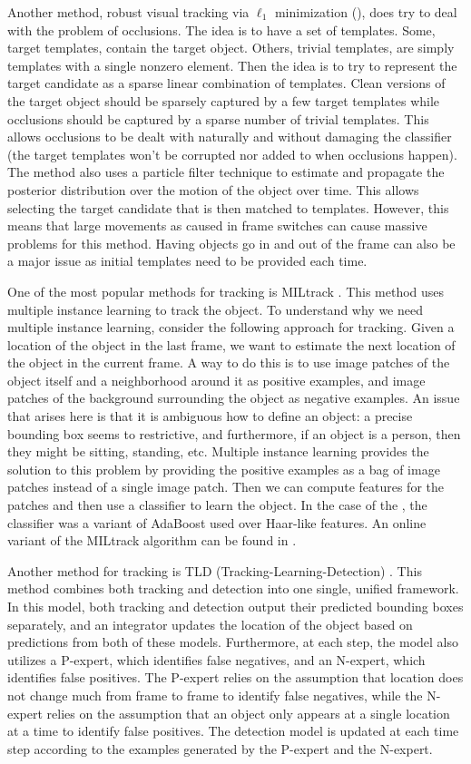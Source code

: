 \documentclass{article}
\begin{document}
Another method, robust visual tracking via $\ell_1$ minimization (\cite{L1}), does try to deal with the problem of occlusions. The idea is to have a set of templates. Some, target templates, contain the target
object. Others, trivial templates, are simply templates with a single nonzero element. Then the idea is to try to represent the target candidate as a sparse linear combination of templates. Clean versions of the
target object should be sparsely captured by a few target templates while occlusions should be captured by a sparse number of trivial templates. This allows occlusions to be dealt with naturally and without
damaging the classifier (the target templates won't be corrupted nor added to when occlusions happen). The method also uses a particle filter technique to estimate and propagate the posterior distribution
over the motion of the object over time. This allows selecting the target candidate that is then matched to templates. However, this means that large movements as caused in frame switches can cause massive
problems for this method. Having objects go in and out of the frame can also be a major issue as initial templates need to be provided each time.

One of the most popular methods for tracking is MILtrack \cite{miltrack}. This
method uses multiple instance learning to track the object. To understand
why we need multiple instance learning, consider the following approach for tracking.
Given a location of the object in the last frame, we want to estimate the next location
of the object in the current frame. A way to do this is to use image patches of the object
itself and a neighborhood around it as positive examples, and image patches of
the background surrounding the object as negative examples. An issue that arises
here is that it is ambiguous how to define an object: a precise bounding box seems
to restrictive, and furthermore, if an object is a person, then they might be sitting,
standing, etc. Multiple instance learning provides the solution to this problem
by providing the positive examples as a bag of image patches instead of a
single image patch. Then we can compute features for the patches and then
use a classifier to learn the object. In the case of the \cite{miltrack},
the classifier was a variant of AdaBoost used over Haar-like features. An online
variant of the MILtrack algorithm can be found in \cite{miltrackonline}.

Another method for tracking is TLD (Tracking-Learning-Detection) \cite{TLD}. This
method combines both tracking and detection into one single, unified framework.
In this model, both tracking and detection output their predicted bounding boxes
separately, and an integrator updates the location of the object based on
predictions from both of these models. Furthermore, at each step, the model
also utilizes a P-expert, which identifies false negatives, and an N-expert,
which identifies false positives. The P-expert relies on the assumption
that location does not change much from frame to frame to identify false negatives,
while the N-expert relies on the assumption that an object only appears at
a single location at a time to identify false positives. The detection model
is updated at each time step according to the examples generated by the P-expert and
the N-expert.
\end{document}
